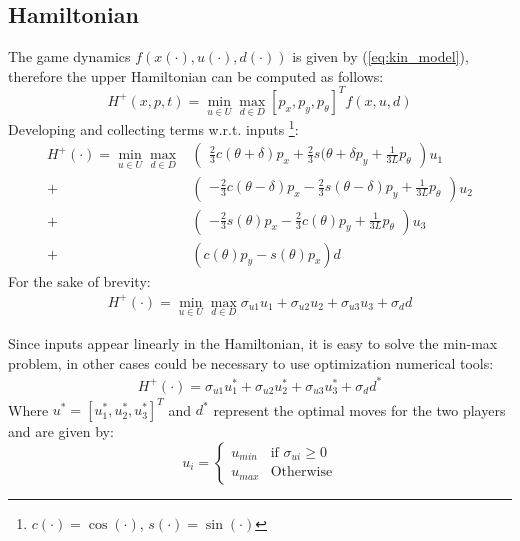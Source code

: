 \subsection{Hamiltonian}
The game dynamics $f(x(\cdot), u(\cdot), d(\cdot))$ is given by (\ref{eq:kin_model}), therefore the upper Hamiltonian can be computed as follows:
\begin{equation*}
  H^+(x,p,t) = \min_{u \in U}\max_{d \in D} [p_x, p_y, p_{\theta}]^T f(x, u, d)
\end{equation*}
Developing and collecting terms w.r.t. inputs \footnote{$c(\cdot)=\cos(\cdot)$, $s(\cdot)=\sin(\cdot)$}:
\begin{equation*}
  \begin{split}
    H^{+}(\cdot) = \min_{u \in U}\max_{d \in D} 
    &
      \begin{pmatrix}
        \frac{2}{3}c{(\theta + \delta)}p_x +  \frac{2}{3}s{(\theta + \delta }p_y + \frac{1}{3L}p_{\theta}
      \end{pmatrix}u_{1} 
    \\ +  
    &
      \begin{pmatrix}
        -\frac{2}{3}c{(\theta -\delta)}p_x -\frac{2}{3}s{(\theta -\delta)}p_y + \frac{1}{3L}p_{\theta} 
      \end{pmatrix}u_{2} 
    \\ +  
    &
      \begin{pmatrix}
        -\frac{2}{3}s{(\theta)}p_x -\frac{2}{3}c{(\theta)}p_y + \frac{1}{3L}p_{\theta} 
      \end{pmatrix}u_{3} 
    \\ + 
    &
      (c{(\theta)}p_y-s{(\theta)}p_x)d
  \end{split}
\end{equation*}
For the sake of brevity:
\begin{equation*}
  \begin{split}
    H^{+}(\cdot) = \min_{u \in U}\max_{d \in D} \sigma_{u1} u_{1} +\sigma_{u2} u_{2} + \sigma_{u3} u_{3} + \sigma_{d} d
  \end{split}
\end{equation*}

Since inputs appear linearly in the Hamiltonian, it is easy to solve the min-max problem, in other cases could be necessary to use optimization numerical tools:
\begin{equation}
  \begin{split}
    H^{+}(\cdot) = \sigma_{u1} u_{1}^* +\sigma_{u2} u_{2}^* + \sigma_{u3} u_{3}^* + \sigma_{d} d^*
  \end{split}
  \label{opt_ham}
\end{equation}
Where $u^* = [u_1^*, u_2^*, u_3^*]^T$ and $d^*$ represent the optimal moves for the two players and are given by:
\begin{equation}
  u_i = 
	\begin{cases} 
		u_{min} &\text{if } \sigma_{ui} \geq 0\\
		u_{max} &\text{Otherwise} 
	\end{cases}
\end{equation}

